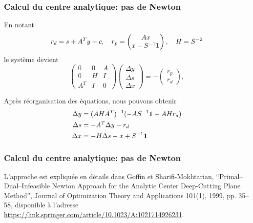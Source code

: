 \documentclass[usepdftitle=false, aspectratio=169]{beamer}
\begin{document}
\begin{frame}
	\frametitle{Calcul du centre analytique: pas de Newton}

En notant	
$$
r_d = s + A^Ty - c,\quad r_p = \begin{pmatrix} Ax \\ x-S^{-1}{\boldsymbol{1}} \end{pmatrix},\quad H = S^{-2}
$$
le système devient
	$$
	\begin{pmatrix}
		0 & 0 & A \\ 0 & H & I \\ A^T & I & 0
	\end{pmatrix}
\begin{pmatrix}
	\Delta y \\ \Delta s \\ \Delta x
\end{pmatrix}
	=
	-
	\begin{pmatrix}
		r_p \\ r_d
	\end{pmatrix},
	$$

\mbox{}

Après réorganisation des équations, nous pouvons obtenir
\begin{align*}
	\Delta y &= (AHA^T)^{-1} (-AS^{-1}{\boldsymbol{1}} - AHr_d )\\
	\Delta s &= -A^T\Delta y - r_d \\
	\Delta x &= -H\Delta s - x + S^{-1}{\boldsymbol{1}}
\end{align*}
	
\end{frame}

\begin{frame}
	\frametitle{Calcul du centre analytique: pas de Newton}
	
	
	\mbox{}
	
	L'approche est expliquée en détails dans Goffin et Sharifi-Mokhtarian, ``Primal--Dual--Infeasible Newton Approach for the Analytic Center Deep-Cutting Plane Method'', Journal of Optimization Theory and Applications 101(1), 1999, pp. 35--58, disponible à l'adresse \url{https://link.springer.com/article/10.1023/A:1021714926231}.
	
\end{frame}
\end{document}
